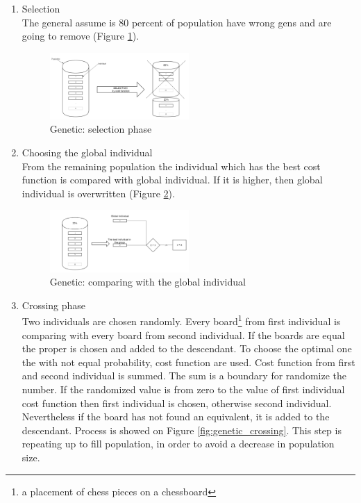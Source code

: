 \documentclass[pdftex]{article}
\begin{document}
\begin{enumerate}
 	\item Selection \hfill \\
		The general assume is 80 percent of population have wrong gens and are going to remove (Figure \ref{fig:genetic_selection}).
		
\begin{figure}[!htb]
	\centering
	\includegraphics[width=0.5\textwidth]{genetic/genetic_selection.png} 
	\caption{Genetic: selection phase}
	\label{fig:genetic_selection}
\end{figure}

	\item Choosing the global individual \hfill \\
		From the remaining population the individual which has the best cost function is compared with global individual. If it is higher, then global individual is overwritten (Figure \ref{fig:genetic_global}).

\begin{figure}[!htb]
	\centering
	\includegraphics[width=0.5\textwidth]{genetic/genetic_global.png} 
	\caption{Genetic: comparing with the global individual}
	\label{fig:genetic_global}
\end{figure}

	\item Crossing phase \hfill \\
		Two individuals are chosen randomly. Every board\footnote{a placement of chess pieces on a chessboard} from first individual is comparing with every board from second individual. If the boards are equal the proper is chosen and added to the descendant. To choose the optimal one the with not equal probability, cost function are used. Cost function from first and second individual is summed. The sum is a boundary for randomize the number. If the randomized value is from zero to the value of first individual cost function then first individual is chosen, otherwise second individual. Nevertheless if the board has not found an equivalent, it is added to the descendant. Process is showed on Figure \ref{fig:genetic_crossing}. This step is repeating up to fill population, in order to avoid a decrease in population size.

\end{enumerate}
\end{document}
